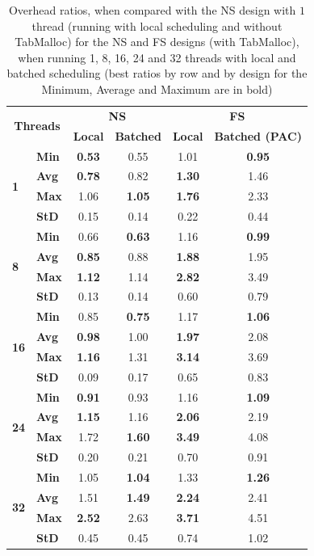 \documentclass{llncs}
\begin{document}
\setlength{\tabcolsep}{12pt}
\begin{table}[!ht]
\centering
\caption{Overhead ratios, when compared with the NS design with $1$
  thread (running with local scheduling and without TabMalloc) for the NS
  and FS designs (with TabMalloc), when running 1, 8, 16, 24 and 32
  threads with local and batched scheduling (best ratios by row and by
  design for the Minimum, Average and Maximum are in bold)}
\begin{tabular}{ll||cc|cc}
\multicolumn{2}{c||}{\multirow{2}{*}{\bf Threads}} &
\multicolumn{2}{c|}{\multirow{1}{*}{\bf NS}} &
\multicolumn{2}{|c}{\multirow{1}{*}{\bf FS}}\\ \cline{3-6}
& 
& \multicolumn{1}{c}{\bf Local}
& \multicolumn{1}{c}{\bf Batched}
& \multicolumn{1}{|c}{\bf Local}
& \multicolumn{1}{c}{\bf Batched (PAC)}\\
\hline\hline
\multirow{4}{*}{\bf 1}
& {\bf Min }& {\bf 0.53}& 0.55& 1.01& {\bf 0.95}\\
& {\bf Avg }& {\bf 0.78}& 0.82& {\bf 1.30}& 1.46\\
& {\bf Max }& 1.06& {\bf 1.05}& {\bf 1.76}& 2.33\\
& {\bf StD }& 0.15& 0.14& 0.22& 0.44\\
\hline
\multirow{4}{*}{\bf 8}
& {\bf Min }& 0.66& {\bf 0.63}& 1.16&{\bf  0.99}\\
& {\bf Avg }& {\bf 0.85}& 0.88& {\bf 1.88}& 1.95\\
& {\bf Max }& {\bf 1.12}& 1.14& {\bf 2.82}& 3.49\\
& {\bf StD }& 0.13& 0.14& 0.60& 0.79\\
\hline
\multirow{4}{*}{\bf 16}
& {\bf Min }& 0.85& {\bf 0.75}& 1.17& {\bf 1.06}\\
& {\bf Avg }& {\bf 0.98}& 1.00& {\bf 1.97}& 2.08\\
& {\bf Max }& {\bf 1.16}& 1.31& {\bf 3.14}& 3.69\\
& {\bf StD }& 0.09& 0.17& 0.65& 0.83\\
\hline
\multirow{4}{*}{\bf 24}
& {\bf Min }& {\bf 0.91}& 0.93& 1.16& {\bf 1.09}\\
& {\bf Avg }& {\bf 1.15}& 1.16& {\bf 2.06}& 2.19\\
& {\bf Max }& 1.72& {\bf 1.60}& {\bf 3.49}& 4.08\\
& {\bf StD }& 0.20& 0.21& 0.70& 0.91\\
\hline
\multirow{4}{*}{\bf 32}
& {\bf Min }& 1.05& {\bf 1.04}& 1.33& {\bf 1.26}\\
& {\bf Avg }& 1.51& {\bf 1.49}& {\bf 2.24}& 2.41\\
& {\bf Max }& {\bf 2.52}& 2.63& {\bf 3.71}& 4.51\\
& {\bf StD }& 0.45& 0.45& 0.74& 1.02\\
\end{tabular}
\label{tab_batched_overhead}
\end{table}
\end{document}
